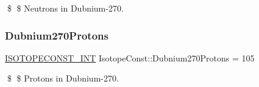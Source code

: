 \$ \$ Neutrons in Dubnium-\/270. \mbox{\label{group___isotope_const-_dubnium-_db270_ga71f7fcf327c0d559d043d8ff1ab4cb94}} 
\subsubsection{\texorpdfstring{Dubnium270\+Protons}{Dubnium270Protons}}
{\footnotesize\ttfamily \mbox{\hyperlink{group___isotope_const-_macros_ga5f18360b3e99483a35c32d789e62621c}{I\+S\+O\+T\+O\+P\+E\+C\+O\+N\+S\+T\+\_\+\+I\+NT}} Isotope\+Const\+::\+Dubnium270\+Protons = 105}

\$ \$ Protons in Dubnium-\/270. 